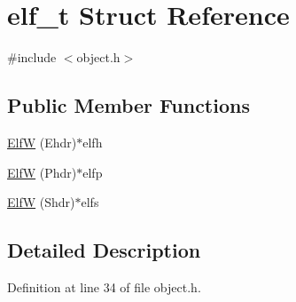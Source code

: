 \hypertarget{structelf__t}{
\section{elf\_\-t Struct Reference}
\label{structelf__t}
}


{\ttfamily \#include $<$object.h$>$}

\subsection*{Public Member Functions}
\begin{DoxyCompactItemize}
\item 
\hyperlink{structelf__t_a1d3ac15b564604b4c498dc2cb2fcbf7d}{ElfW} (Ehdr)$\ast$elfh
\item 
\hyperlink{structelf__t_aeb8318c0cec6c40b894501f642eb48af}{ElfW} (Phdr)$\ast$elfp
\item 
\hyperlink{structelf__t_a8d13c40a423933db401e96252c7af381}{ElfW} (Shdr)$\ast$elfs
\end{DoxyCompactItemize}


\subsection{Detailed Description}


Definition at line 34 of file object.h.



